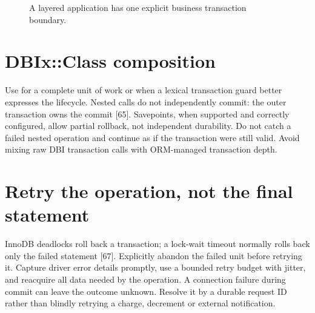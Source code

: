 \begin{figure}[!htbp]\centering
{}
\caption{A layered application has one explicit business transaction boundary.}
\end{figure}

\section{DBIx::Class composition}
Use  for a complete unit of work or 
when a lexical transaction guard better expresses the lifecycle.
Nested  calls do not independently commit: the outer transaction
owns the commit [65]. Savepoints, when supported and correctly configured,
allow partial rollback, not independent durability. Do not catch a failed
nested operation and continue as if the transaction were still valid.
Avoid mixing raw DBI transaction calls with ORM-managed transaction depth.

\section{Retry the operation, not the final statement}
InnoDB deadlocks roll back a transaction; a lock-wait timeout normally
rolls back only the failed statement [67]. Explicitly abandon the failed
unit before retrying it. Capture driver error details promptly, use a
bounded retry budget with jitter, and reacquire all data needed by the
operation. A connection failure during commit can leave the outcome
unknown. Resolve it by a durable request ID rather than blindly retrying
a charge, decrement or external notification.

